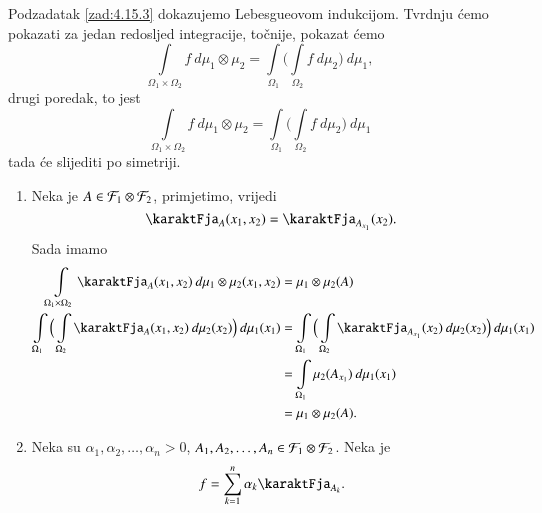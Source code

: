 \begin{rj}[\ref{zad:4.15}]
\begin{enumerate}[label=(\roman*)]
        Podzadatak \ref{zad:4.15.3} dokazujemo Lebesgueovom indukcijom.
        Tvrdnju \' cemo pokazati za jedan redosljed integracije, to\v cnije, pokazat \' cemo
        \begin{equation*}
            \int\limits_{\Omega_1 \times \Omega_2} f \: d \mu_1 \otimes \mu_2 = \int\limits_{\Omega_1} \Big( \int\limits_{\Omega_2} f \: d \mu_2 \Big) \: d \mu_1,
        \end{equation*}
        drugi poredak, to jest
        \begin{equation*}
            \int\limits_{\Omega_1 \times \Omega_2} f \: d \mu_1 \otimes \mu_2 = \int\limits_{\Omega_1} \Big( \int\limits_{\Omega_2} f \: d \mu_2 \Big) \: d \mu_1
        \end{equation*}
        tada \' ce slijediti po simetriji.
        \begin{enumerate}[label=\arabic*. korak:]
            \item
            Neka je $A \in \mathcal{F}_1 \otimes \mathcal{F}_2$, primjetimo, vrijedi
            \begin{equation*}
                \karaktFja_A (x_1, x_2) = \karaktFja_{A_{x_1}} (x_2).
            \end{equation*}
            Sada imamo
            \begin{equation*}
                \begin{aligned}
                    \int\limits_{\Omega_1 \times \Omega_2} \karaktFja_A (x_1, x_2) \: d \mu_1 \otimes \mu_2 (x_1, x_2) &= \mu_1 \otimes \mu_2 (A)\\
                    \int\limits_{\Omega_1} \Big( \int\limits_{\Omega_2} \karaktFja_A (x_1, x_2) \: d \mu_2 (x_2) \Big) \: d \mu_1 (x_1) &= \int\limits_{\Omega_1} \Big( \int\limits_{\Omega_2} \karaktFja_{A_{x_1}} (x_2) \: d \mu_2 (x_2) \Big) \: d  \mu_1 (x_1)\\
                    &= \int\limits_{\Omega_1} \mu_2 (A_{x_1}) \: d \mu_1 (x_1)\\
                    &= \mu_1 \otimes \mu_2 (A).
                \end{aligned}
            \end{equation*}
            \item
            Neka su $\alpha_1, \alpha_2, \ldots, \alpha_n > 0$, $A_1, A_2, \ldots, A_n \in \mathcal{F}_1 \otimes \mathcal{F}_2$.
            Neka je
            \begin{equation*}
                f = \suma{k = 1}{n} \alpha_k \karaktFja_{A_k}.
            \end{equation*}

\end{enumerate}
\end{enumerate}
\end{rj}
